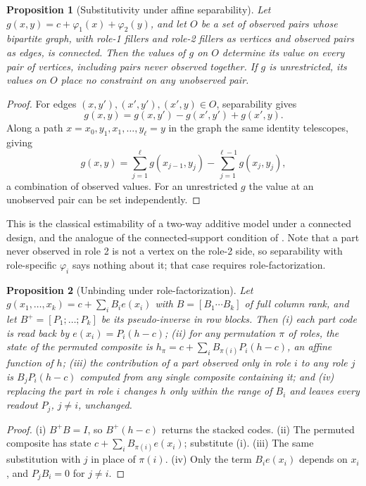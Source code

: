 \documentclass[10pt]{article}
\theoremstyle{plain}
\newtheorem{proposition}{Proposition}
\theoremstyle{remark}
\begin{document}
\begin{proposition}[Substitutivity under affine separability]
\label{prop:separable}
Let $g(x, y) = c + \varphi_1(x) + \varphi_2(y)$, and let $O$ be a set of observed pairs whose bipartite graph, with role-1 fillers and role-2 fillers as vertices and observed pairs as edges, is connected. Then the values of $g$ on $O$ determine its value on every pair of vertices, including pairs never observed together. If $g$ is unrestricted, its values on $O$ place no constraint on any unobserved pair.
\end{proposition}

\begin{proof}
For edges $(x, y'), (x', y'), (x', y) \in O$, separability gives
\[
  g(x, y) = g(x, y') - g(x', y') + g(x', y).
\]
Along a path $x = x_0, y_1, x_1, \ldots, y_\ell = y$ in the graph the same identity telescopes, giving
\[
  g(x, y) = \sum_{j=1}^{\ell} g(x_{j-1}, y_j) - \sum_{j=1}^{\ell-1} g(x_j, y_j),
\]
a combination of observed values. For an unrestricted $g$ the value at an unobserved pair can be set independently.
\end{proof}

\noindent
This is the classical estimability of a two-way additive model under a connected design, and the analogue of the connected-support condition of \citet{schug2024}. Note that a part never observed in role 2 is not a vertex on the role-2 side, so separability with role-specific $\varphi_i$ says nothing about it; that case requires role-factorization.

\begin{proposition}[Unbinding under role-factorization]
\label{prop:systematic}
Let $g(x_1, \ldots, x_k) = c + \sum_i B_i e(x_i)$ with $B = [B_1 \cdots B_k]$ of full column rank, and let $B^{+} = [P_1; \ldots; P_k]$ be its pseudo-inverse in row blocks. Then (i) each part code is read back by $e(x_i) = P_i(h - c)$; (ii) for any permutation $\pi$ of roles, the state of the permuted composite is $h_\pi = c + \sum_i B_{\pi(i)} P_i (h - c)$, an affine function of $h$; (iii) the contribution of a part observed only in role $i$ to any role $j$ is $B_j P_i (h - c)$ computed from any single composite containing it; and (iv) replacing the part in role $i$ changes $h$ only within the range of $B_i$ and leaves every readout $P_j$, $j \ne i$, unchanged.
\end{proposition}

\begin{proof}
(i) $B^{+}B = I$, so $B^{+}(h - c)$ returns the stacked codes. (ii) The permuted composite has state $c + \sum_i B_{\pi(i)} e(x_i)$; substitute (i). (iii) The same substitution with $j$ in place of $\pi(i)$. (iv) Only the term $B_i e(x_i)$ depends on $x_i$, and $P_j B_i = 0$ for $j \neq i$.
\end{proof}
\end{document}
